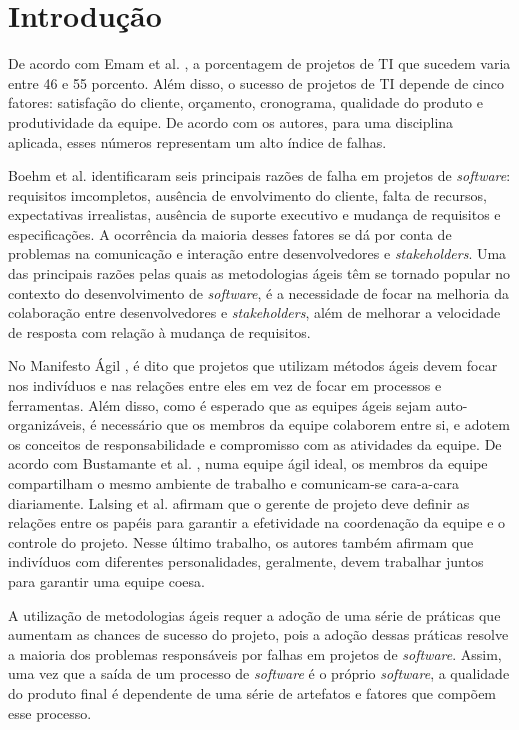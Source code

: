 \chapter{Introdução}
\label{intro}

De acordo com Emam et al. \cite{emam}, a porcentagem de projetos de TI que sucedem varia entre 46 e 55 porcento. Além disso, o sucesso de projetos de TI depende de cinco fatores: satisfação do cliente, orçamento, cronograma, qualidade do produto e produtividade da equipe. De acordo com os autores, para uma disciplina aplicada, esses números representam um alto índice de falhas.

Boehm et al. \cite{boehm} identificaram seis principais razões de falha em projetos de \textit{software}: requisitos imcompletos, ausência de envolvimento do cliente, falta de recursos, expectativas irrealistas, ausência de suporte executivo e mudança de requisitos e especificações. A ocorrência da maioria desses fatores se dá por conta de problemas na comunicação e interação entre desenvolvedores e \textit{stakeholders}. Uma das principais razões pelas quais as metodologias ágeis têm se tornado popular no contexto do desenvolvimento de \textit{software}, é a necessidade de focar na melhoria da colaboração entre desenvolvedores e \textit{stakeholders}, além de melhorar a velocidade de resposta com relação à mudança de requisitos.

No Manifesto Ágil \cite{manifesto}, é dito que projetos que utilizam métodos ágeis devem focar nos indivíduos e nas relações entre eles em vez de focar em processos e ferramentas. Além disso, como é esperado que as equipes ágeis sejam auto-organizáveis, é necessário que os membros da equipe colaborem entre si, e adotem os conceitos de responsabilidade e compromisso com as atividades da equipe. De acordo com Bustamante et al. \cite{bustamante}, numa equipe ágil ideal, os membros da equipe compartilham o mesmo ambiente de trabalho e comunicam-se cara-a-cara diariamente. Lalsing et al. \cite{lalsing} afirmam que o gerente de projeto deve definir as relações entre os papéis para garantir a efetividade na coordenação da equipe e o controle do projeto. Nesse último trabalho, os autores também afirmam que indivíduos com diferentes personalidades, geralmente, devem trabalhar juntos para garantir uma equipe coesa.

A utilização de metodologias ágeis requer a adoção de uma série de práticas que aumentam as chances de sucesso do projeto, pois a adoção dessas práticas resolve a maioria dos problemas responsáveis por falhas em projetos de \textit{software}. Assim, uma vez que a saída de um processo de \textit{software} é o próprio \textit{software}, a qualidade do produto final é dependente de uma série de artefatos e fatores que compõem esse processo.

